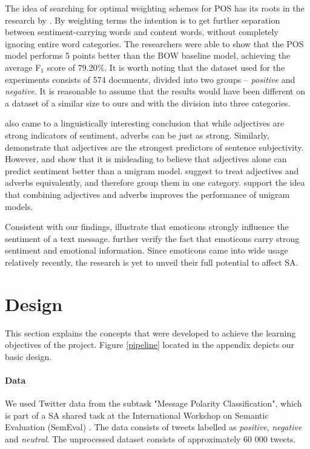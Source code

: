 \documentclass[titlepage]{article}
\begin{document}
      The idea of searching for optimal weighting schemes for POS has its roots in the research by \cite{improving-sa}. By weighting terms the intention is to get further separation between sentiment-carrying words and content words, without completely ignoring entire word categories. The researchers were able to show that the POS model performs 5 points better than the BOW baseline model, achieving the average F$_{1}$ score of 79.20\%. It is worth noting that the dataset used for the experiments consists of 574 documents, divided into two groups -- \textit{positive} and \textit{negative}. It is reasonable to assume that the results would have been different on a dataset of a similar size to ours and with the division into three categories. 
      
       \cite{improving-sa} also came to a linguistically interesting conclusion that while adjectives are strong indicators of sentiment, adverbs can be just as strong. Similarly, \cite{hatz} demonstrate that adjectives are the strongest predictors of sentence subjectivity. However, \citep{thumbs} and \cite{benamara} show that it is misleading to believe that adjectives alone can predict sentiment better than a unigram model. \cite{pos-based-model} suggest to treat adjectives and adverbs equivalently, and therefore group them in one category. \cite{benamara} support the idea that combining adjectives and adverbs improves the performance of unigram models.

Consistent with our findings, \cite{hu} illustrate that emoticons strongly influence the sentiment of a text message. \cite{felbo} further verify the fact that emoticons carry strong sentiment and emotional information. Since emoticons came into wide usage relatively recently, the research is yet to unveil their full potential to affect SA.

\section{Design}


This section explains the concepts that were developed to achieve the learning objectives of the project. Figure \ref{pipeline} located in the appendix depicts our basic design. 


      \paragraph{Data} We used Twitter data from the subtask "Message Polarity Classification", which is part of a SA shared task at the International Workshop on Semantic Evaluation (SemEval) \citep{SemEval}. The data consists of tweets labelled as \textit{positive}, \textit{negative} and \textit{neutral}. The unprocessed dataset consists of approximately 60 000 tweets. 
\end{document}
